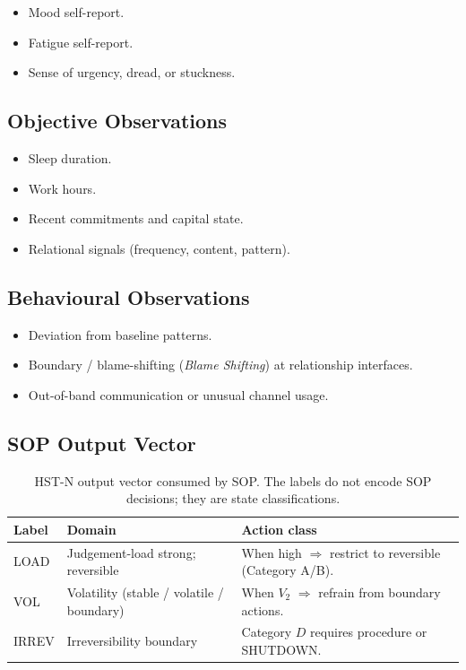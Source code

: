 \begin{itemize}
\item Mood self-report.
\item Fatigue self-report.
\item Sense of urgency, dread, or stuckness.
\end{itemize}

\subsection{Objective Observations}

\begin{itemize}
\item Sleep duration.
\item Work hours.
\item Recent commitments and capital state.
\item Relational signals (frequency, content, pattern).
\end{itemize}

\subsection{Behavioural Observations}

\begin{itemize}
\item Deviation from baseline patterns.
\item Boundary / blame-shifting (\textit{Blame Shifting}) at
relationship interfaces.
\item Out-of-band communication or unusual channel usage.
\end{itemize}

\subsection{SOP Output Vector}

\begin{table}[ht]
\centering
\small
\begin{tabularx}{\linewidth}{lXX}
\toprule
\textbf{Label} & \textbf{Domain} & \textbf{Action class} \\
\midrule
LOAD
& Judgement-load strong; reversible
& When high $\Rightarrow$ restrict to reversible (Category A/B). \\
VOL
& Volatility (stable / volatile / boundary)
& When $V_2$ $\Rightarrow$ refrain from boundary actions. \\
IRREV
& Irreversibility boundary
& Category $D$ requires procedure or SHUTDOWN. \\
\bottomrule
\end{tabularx}
\caption[HST-N output vector]{HST-N output vector consumed by SOP.
The labels do not encode SOP decisions; they are state
classifications.}
\label{tab:hstn-output-vector}
\end{table}

